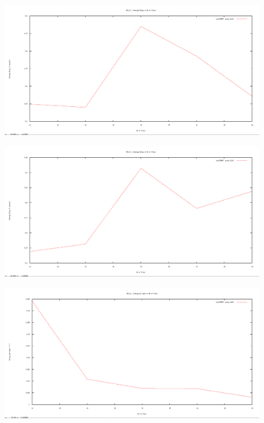 \documentclass[12pt]{article}
\begin{document}
\begin{figure}[H]
	\centering
	\includegraphics[scale=	0.26]{image/bpics/bm_averagedelay_vs_flows.png}
\end{figure}

\begin{figure}[H]
	\centering
	\includegraphics[scale=	0.26]{image/apics/am_averagedelay_vs_flows.png}
\end{figure}

\begin{figure}[H]
	\centering
	\includegraphics[scale=	0.26]{image/bpics/bm_energyperbyte_vs_flows.png}
\end{figure}
\end{document}
